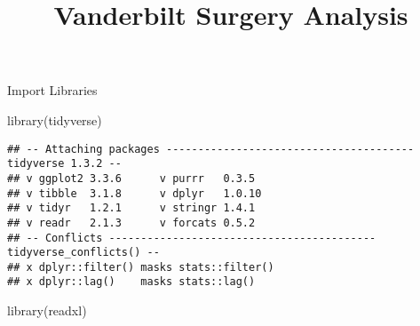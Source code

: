 \documentclass[
  ignorenonframetext,
]{beamer}
\title{Vanderbilt Surgery Analysis}
\author{}
\date{\vspace{-2.5em}}
\newenvironment{Shaded}{\begin{snugshade}}{\end{snugshade}}
\newcommand{\FunctionTok}[1]{\textcolor[rgb]{0.00,0.00,0.00}{#1}}
\newcommand{\NormalTok}[1]{#1}
\begin{document}
\frame{\titlepage}

\begin{frame}[fragile]{Import Libraries}
\protect\hypertarget{import-libraries}{}
\begin{Shaded}
\begin{Highlighting}[]
\FunctionTok{library}\NormalTok{(tidyverse)}
\end{Highlighting}
\end{Shaded}

\begin{verbatim}
## -- Attaching packages --------------------------------------- tidyverse 1.3.2 --
## v ggplot2 3.3.6      v purrr   0.3.5 
## v tibble  3.1.8      v dplyr   1.0.10
## v tidyr   1.2.1      v stringr 1.4.1 
## v readr   2.1.3      v forcats 0.5.2 
## -- Conflicts ------------------------------------------ tidyverse_conflicts() --
## x dplyr::filter() masks stats::filter()
## x dplyr::lag()    masks stats::lag()
\end{verbatim}

\begin{Shaded}
\begin{Highlighting}[]
\FunctionTok{library}\NormalTok{(readxl)}
\end{Highlighting}
\end{Shaded}
\end{frame}
\end{document}
